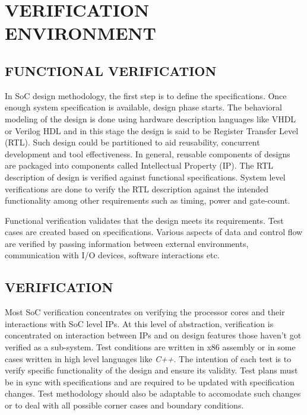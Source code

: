 \chapter{VERIFICATION ENVIRONMENT}
\label{chap:verification.tex}

\section {FUNCTIONAL VERIFICATION}

In SoC design methodology, the first step is to define the specifications. Once enough system specification is available, design phase starts. The behavioral modeling of the design is done using hardware description languages like VHDL or Verilog HDL and in this stage the design is said to be Register Transfer Level (RTL). Such design could be partitioned to aid reusability, concurrent development and tool effectiveness. In general, reusable components of designs are packaged into components called Intellectual Property (IP). The RTL description of design is verified against functional specifications. System level verifications are done to verify the RTL description against the intended functionality among other requirements such as timing, power and gate-count. 



Functional verification validates that the design meets its requirements. Test cases are created based on specifications. Various aspects of data and control flow are verified by passing information between external environments, communication with I/O devices,  software interactions etc. 
 
\section {VERIFICATION}

Most SoC verification concentrates on verifying the processor cores and their interactions with SoC level IPs. At this level of abstraction, verification is concentrated on interaction between IPs and on design features those haven't got verified as a sub-system.  Test conditions are written in x86 assembly or in some cases written in high level languages like {\it C++}. The intention of each test is to verify specific functionality of the design and ensure its validity. Test plans must be in sync with specifications and are required to be updated with specification changes. Test methodology should also be adaptable to accomodate such changes or to deal with all possible corner cases and boundary conditions.

